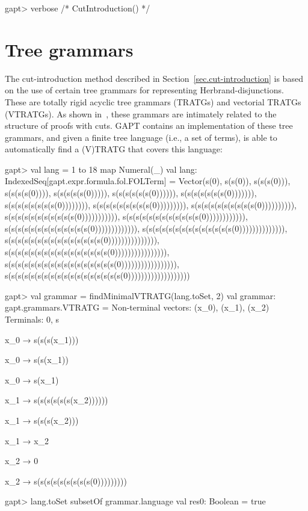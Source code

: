 \documentclass[a4paper,11pt]{book}
\begin{document}
\begin{clilisting}
gapt> verbose { /* CutIntroduction() */ }

\end{clilisting}

\section{Tree grammars}

The cut-introduction method described in Section~\ref{sec.cut-introduction} is
based on the use of certain tree grammars for representing Herbrand-disjunctions.
These are totally rigid acyclic tree grammars (TRATGs) and vectorial TRATGs (VTRATGs).
As shown in~\cite{Hetzl14Algorithmic}, these grammars are intimately related to
the structure of proofs with cuts.  GAPT contains an implementation of
these tree grammars, and given a finite tree language (i.e., a set of terms), is
able to automatically find a (V)TRATG that covers this language:

\begin{clilisting}
gapt> val lang = 1 to 18 map { Numeral(_) }
val lang: IndexedSeq[gapt.expr.formula.fol.FOLTerm] = Vector(s(0), s(s(0)), s(s(s(0))), s(s(s(s(0)))), s(s(s(s(s(0))))), s(s(s(s(s(s(0)))))), s(s(s(s(s(s(s(0))))))), s(s(s(s(s(s(s(s(0)))))))), s(s(s(s(s(s(s(s(s(0))))))))), s(s(s(s(s(s(s(s(s(s(0)))))))))), s(s(s(s(s(s(s(s(s(s(s(0))))))))))), s(s(s(s(s(s(s(s(s(s(s(s(0)))))))))))), s(s(s(s(s(s(s(s(s(s(s(s(s(0))))))))))))), s(s(s(s(s(s(s(s(s(s(s(s(s(s(0)))))))))))))), s(s(s(s(s(s(s(s(s(s(s(s(s(s(s(0))))))))))))))), s(s(s(s(s(s(s(s(s(s(s(s(s(s(s(s(0)))))))))))))))), s(s(s(s(s(s(s(s(s(s(s(s(s(s(s(s(s(0))))))))))))))))), s(s(s(s(s(s(s(s(s(s(s(s(s(s(s(s(s(s(0)))))))))))))))))))

gapt> val grammar = findMinimalVTRATG(lang.toSet, 2)
val grammar: gapt.grammars.VTRATG =
Non-terminal vectors: (x_0), (x_1), (x_2)
Terminals: 0, s

x_0 → s(s(s(x_1)))

x_0 → s(s(x_1))

x_0 → s(x_1)

x_1 → s(s(s(s(s(s(x_2))))))

x_1 → s(s(s(x_2)))

x_1 → x_2

x_2 → 0

x_2 → s(s(s(s(s(s(s(s(s(0)))))))))

gapt> lang.toSet subsetOf grammar.language
val res0: Boolean = true

\end{clilisting}
\end{document}
